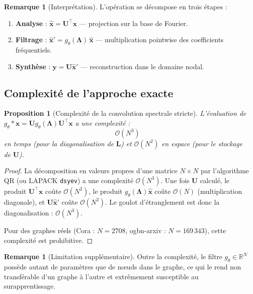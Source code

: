 \documentclass[12pt, a4paper]{article}
\newtheorem{proposition}[theorem]{Proposition}
\theoremstyle{definition}
\newtheorem{remark}[theorem]{Remarque}
\newcommand{\R}{\mathbb{R}}
\newcommand{\mat}[1]{\mathbf{#1}}
\newcommand{\L}{\mat{L}}
\newcommand{\Lam}{\mat{\Lambda}}
\newcommand{\U}{\mat{U}}
\newcommand{\x}{\mathbf{x}}
\newcommand{\y}{\mathbf{y}}
\begin{document}
\begin{remark}[Interprétation]
L'opération se décompose en trois étapes :
\begin{enumerate}
  \item \textbf{Analyse} : $\hat{\x} = \U^\top \x$ --- projection sur la base de Fourier.
  \item \textbf{Filtrage} : $\hat{\x}' = g_\theta(\Lam)\, \hat{\x}$ --- multiplication pointwise des coefficients fréquentiels.
  \item \textbf{Synthèse} : $\y = \U \hat{\x}'$ --- reconstruction dans le domaine nodal.
\end{enumerate}
\end{remark}

\subsection{Complexité de l'approche exacte}

\begin{proposition}[Complexité de la convolution spectrale stricte]
\label{prop:complexity_strict}
L'évaluation de $g_\theta * \x = \U g_\theta(\Lam) \U^\top \x$ a une complexité :
\[
  \mathcal{O}(N^3)
\]
en temps (pour la diagonalisation de $\L$) et $\mathcal{O}(N^2)$ en espace
(pour le stockage de $\U$).
\end{proposition}

\begin{proof}
La décomposition en valeurs propres d'une matrice $N \times N$ par l'algorithme QR
(ou LAPACK \texttt{dsyev}) a une complexité $\mathcal{O}(N^3)$.
Une fois $\U$ calculé, le produit $\U^\top \x$ coûte $\mathcal{O}(N^2)$,
le produit $g_\theta(\Lam) \hat{\x}$ coûte $\mathcal{O}(N)$
(multiplication diagonale), et $\U \hat{\x}'$ coûte $\mathcal{O}(N^2)$.
Le goulot d'étranglement est donc la diagonalisation : $\mathcal{O}(N^3)$.

Pour des graphes réels (Cora : $N = 2708$, ogbn-arxiv : $N = 169\,343$),
cette complexité est prohibitive.
\end{proof}

\begin{remark}[Limitation supplémentaire]
Outre la complexité, le filtre $g_\theta \in \R^N$ possède autant de paramètres
que de nœuds dans le graphe, ce qui le rend non transférable d'un graphe à l'autre
et extrêmement susceptible au surapprentissage.
\end{remark}

\end{document}
